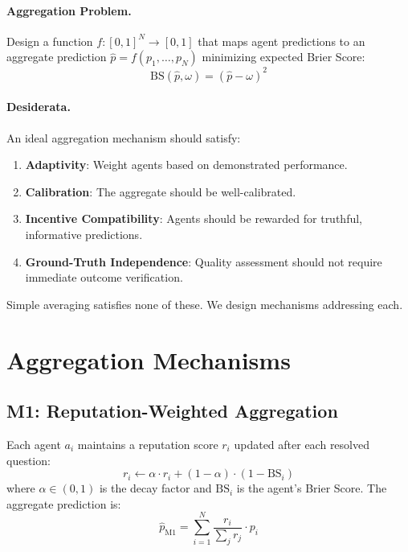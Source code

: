 \documentclass[conference]{IEEEtran}
\begin{document}
\paragraph{Aggregation Problem.}
Design a function $f: [0,1]^N \rightarrow [0,1]$ that maps agent predictions to an aggregate prediction $\hat{p} = f(p_1, \ldots, p_N)$ minimizing expected Brier Score:
\begin{equation}
    \text{BS}(\hat{p}, \omega) = (\hat{p} - \omega)^2
\end{equation}

\paragraph{Desiderata.}
An ideal aggregation mechanism should satisfy:
\begin{enumerate}
    \item \textbf{Adaptivity}: Weight agents based on demonstrated performance.
    \item \textbf{Calibration}: The aggregate should be well-calibrated.
    \item \textbf{Incentive Compatibility}: Agents should be rewarded for truthful, informative predictions.
    \item \textbf{Ground-Truth Independence}: Quality assessment should not require immediate outcome verification.
\end{enumerate}

Simple averaging satisfies none of these. We design mechanisms addressing each.


\section{Aggregation Mechanisms}
\label{sec:mechanisms}

\subsection{M1: Reputation-Weighted Aggregation}

Each agent $a_i$ maintains a reputation score $r_i$ updated after each resolved question:
\begin{equation}
    r_i \leftarrow \alpha \cdot r_i + (1 - \alpha) \cdot (1 - \text{BS}_i)
\end{equation}
where $\alpha \in (0,1)$ is the decay factor and $\text{BS}_i$ is the agent's Brier Score. The aggregate prediction is:
\begin{equation}
    \hat{p}_{\text{M1}} = \sum_{i=1}^{N} \frac{r_i}{\sum_j r_j} \cdot p_i
\end{equation}
\end{document}
